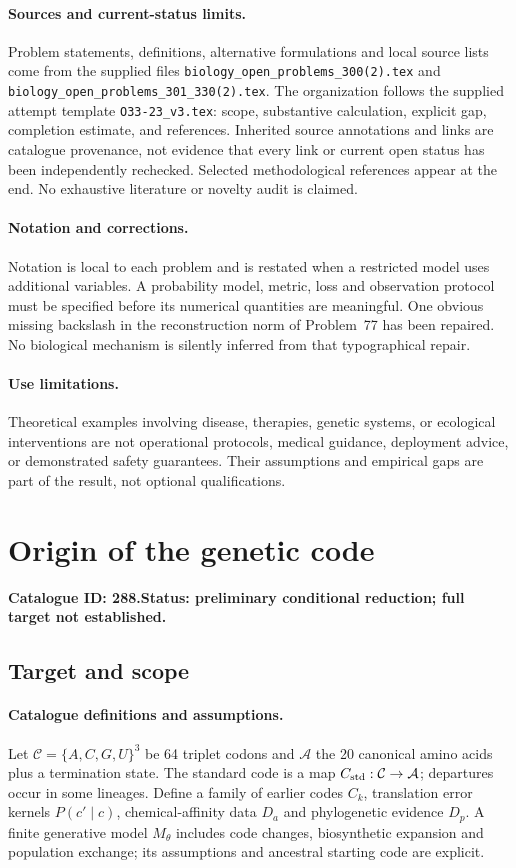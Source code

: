 \documentclass[11pt]{article}
\begin{document}
\paragraph{Sources and current-status limits.}
Problem statements, definitions, alternative formulations and local source lists
come from the supplied files
\texttt{biology\_open\_problems\_300(2).tex} and
\texttt{biology\_open\_problems\_301\_330(2).tex}.
The organization follows the supplied attempt template
\texttt{O33-23\_v3.tex}: scope, substantive calculation, explicit gap,
completion estimate, and references. Inherited source annotations and links are
catalogue provenance, not evidence that every link or current open status has
been independently rechecked. Selected methodological references appear at the
end. No exhaustive literature or novelty audit is claimed.

\paragraph{Notation and corrections.}
Notation is local to each problem and is restated when a restricted model uses
additional variables. A probability model, metric, loss and observation protocol
must be specified before its numerical quantities are meaningful. One obvious
missing backslash in the reconstruction norm of Problem~77 has been repaired.
No biological mechanism is silently inferred from that typographical repair.

\paragraph{Use limitations.}
Theoretical examples involving disease, therapies, genetic systems, or ecological
interventions are not operational protocols, medical guidance, deployment advice,
or demonstrated safety guarantees. Their assumptions and empirical gaps are part
of the result, not optional qualifications.

\setcounter{section}{287}
\section{Origin of the genetic code}
\label{prob:288}
\noindent\textbf{Catalogue ID: 288.}\quad \textbf{Status: preliminary conditional reduction; full target not established.}
\subsection{Target and scope}
\paragraph{Catalogue definitions and assumptions.}
Let $\mathcal C=\{A,C,G,U\}^3$ be 64 triplet codons and $\mathcal A$ the 20 canonical amino acids plus a termination state. The standard code is a map $C_{\rm std}:\mathcal C\to\mathcal A$; departures occur in some lineages. Define a family of earlier codes $C_k$, translation error kernels $P(c'\mid c)$, chemical-affinity data $D_a$ and phylogenetic evidence $D_p$. A finite generative model $M_\theta$ includes code changes, biosynthetic expansion and population exchange; its assumptions and ancestral starting code are explicit.
\end{document}
